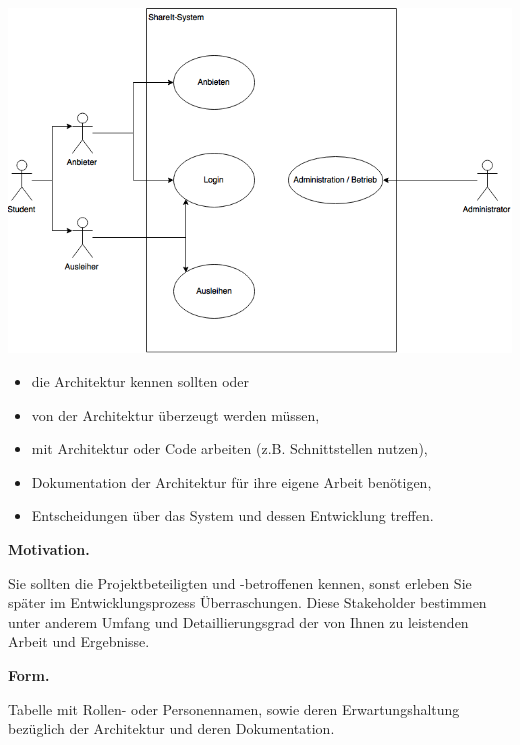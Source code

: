 \documentclass[]{article}
\begin{document}
\includegraphics{images/UseCaseDiagram.png}
\begin{itemize}
\item
  die Architektur kennen sollten oder
\item
  von der Architektur überzeugt werden müssen,
\item
  mit Architektur oder Code arbeiten (z.B. Schnittstellen nutzen),
\item
  Dokumentation der Architektur für ihre eigene Arbeit benötigen,
\item
  Entscheidungen über das System und dessen Entwicklung treffen.
\end{itemize}

\textbf{Motivation.}

Sie sollten die Projektbeteiligten und -betroffenen kennen, sonst
erleben Sie später im Entwicklungsprozess Überraschungen. Diese
Stakeholder bestimmen unter anderem Umfang und Detaillierungsgrad der
von Ihnen zu leistenden Arbeit und Ergebnisse.

\textbf{Form.}

Tabelle mit Rollen- oder Personennamen, sowie deren Erwartungshaltung
bezüglich der Architektur und deren Dokumentation.
\end{document}
